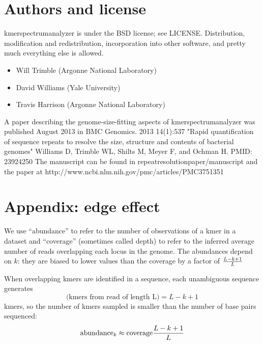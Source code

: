 \documentclass[11pt,fullpage]{article}
\begin{document}
\section{Authors and license}
kmerspectrumanalyzer is under the BSD license; see LICENSE.
Distribution, modification and redistribution, incorporation
into other software, and pretty much everything else is allowed.

\begin{itemize}
\item Will Trimble (Argonne National Laboratory)
\item David Williams (Yale University)
\item Travis Harrison (Argonne National Laboratory)
\end{itemize}

A paper describing the genome-size-fitting aspects of kmerspectrumanalyzer was
published August 2013 in BMC Genomics. 2013 14(1):537
"Rapid quantification of sequence repeats to resolve the size,
structure and contents of bacterial genomes"
Williams D, Trimble WL, Shilts M, Meyer F, and Ochman H.  PMID: 23924250
The manuscript can be found in repeatresolutionpaper/manuscript and
the paper at http://www.ncbi.nlm.nih.gov/pmc/articles/PMC3751351

\section{Appendix: edge effect}
We use ``abundance'' to refer to the number of observations of a kmer in a
dataset and ``coverage'' (sometimes called depth) to refer to the inferred average
number of reads overlapping each locus in the genome.  The abundances depend on $k$:
they are biased to lower values than
the coverage by a factor of $ {L - k + 1} \over {L} $

When overlapping kmers are identified in a sequence, each unambiguous sequence generates
$$ \textrm{(kmers from read of length L)} = L - k + 1 $$
kmers, so the number of kmers sampled is smaller than the number of base pairs sequenced:
$$\textrm{abundance}_k \approx \textrm{coverage} {{L - k + 1} \over {L}}$$

{}

\end{document}
